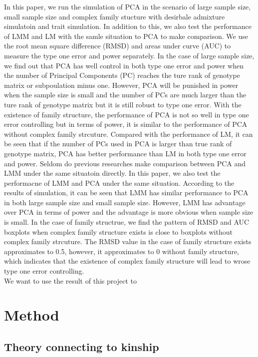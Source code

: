 \documentclass[12pt]{article}
\begin{document}
In this paper, we run the simulation of PCA in the scenario of large sample size, small sample size and complex family stucture with desirbale admixture simulatoin and trait simulation. In addition to this, we also test the performance of LMM and LM with the samle situation to PCA to make comparison. We use the root mean square difference (RMSD) and areas under curve (AUC) to measure the type one error and power separately. In the case of large sample size, we find out that PCA has well control in both type one error and power when the number of Principal Components (PC) reaches the ture rank of genotype matrix or subpoulation minus one. However, PCA will be punished in power when the sample size is small and the number of PCs are much larger than the ture rank of genotype matrix but it is still robust to type one error. With the existence of family structure, the performance of PCA is not so well in type one error controlling but in terms of power, it is similar to the performance of PCA without complex family strcuture. Compared with the performance of LM, it can be seen that if the number of PCs used in PCA is larger than true rank of genotype matrix, PCA has better performance than LM in both type one error and power. Seldom do previous researches make comparison between PCA and LMM under the same situatoin directly. In this paper, we also test the performacne of LMM and PCA under the same situation. According to the results of simulation, it can be seen that LMM has similar performance to PCA in both large sample size and small sample size. However, LMM has advantage over PCA in terms of power and the advantage is more obvious when sample size is small. In the case of family structrue, we find the pattern of RMSD and AUC boxplots when complex family structure exists is close to boxplots without complex family strcuture. The RMSD value in the case of family structure exists approximates to 0.5, however, it approximates to 0 without family structure, which indicates that the existence of complex family structure will lead to wrose type one error controlling.\\

We want to use the result of this project to 
 
\section{Method} 
\subsection{Theory connecting to kinship}
\end{document}
